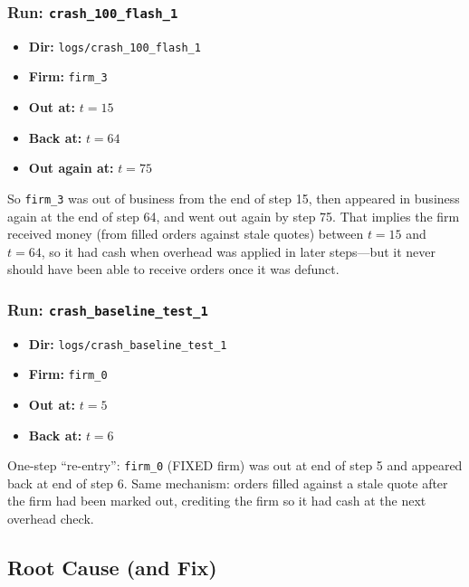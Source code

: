 \documentclass{article}
\begin{document}
\subsubsection{Run: \texttt{crash\_100\_flash\_1}}
\begin{itemize}
    \item \textbf{Dir:} \texttt{logs/crash\_100\_flash\_1}
    \item \textbf{Firm:} \texttt{firm\_3}
    \item \textbf{Out at:} \(t = 15\)
    \item \textbf{Back at:} \(t = 64\)
    \item \textbf{Out again at:} \(t = 75\)
\end{itemize}
So \texttt{firm\_3} was out of business from the end of step 15, then appeared in business again at the end of step 64, and went out again by step 75. That implies the firm received money (from filled orders against stale quotes) between \(t = 15\) and \(t = 64\), so it had cash when overhead was applied in later steps---but it never should have been able to receive orders once it was defunct.

\subsubsection{Run: \texttt{crash\_baseline\_test\_1}}
\begin{itemize}
    \item \textbf{Dir:} \texttt{logs/crash\_baseline\_test\_1}
    \item \textbf{Firm:} \texttt{firm\_0}
    \item \textbf{Out at:} \(t = 5\)
    \item \textbf{Back at:} \(t = 6\)
\end{itemize}
One-step ``re-entry'': \texttt{firm\_0} (FIXED firm) was out at end of step 5 and appeared back at end of step 6. Same mechanism: orders filled against a stale quote after the firm had been marked out, crediting the firm so it had cash at the next overhead check.

\subsection{Root Cause (and Fix)}
\end{document}
